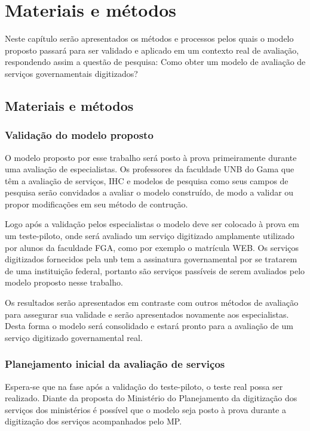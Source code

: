 \chapter[Materiais e métodos]{Materiais e métodos}
Neste capítulo serão apresentados os métodos e processos pelos quais o modelo proposto passará para ser validado e aplicado em um contexto real de avaliação, respondendo assim a questão de pesquisa: Como obter um modelo de avaliação de serviços governamentais digitizados?

\section{Materiais e métodos}
	\subsection{Validação do modelo proposto}
	O modelo proposto por esse trabalho será posto à prova primeiramente durante uma avaliação de especialistas. Os professores da faculdade UNB do Gama que têm a avaliação de serviços, IHC e modelos de pesquisa como seus campos de pesquisa serão convidados a avaliar o modelo construído, de modo a validar ou propor modificações em seu método de contrução.

	Logo após a validação pelos especialistas o modelo deve ser colocado à prova em um teste-piloto, onde será avaliado um serviço digitizado amplamente utilizado por alunos da faculdade FGA, como por exemplo o matrícula WEB. Os serviços digitizados fornecidos pela unb tem a assinatura governamental por se tratarem de uma instituição federal, portanto são serviços passíveis de serem avaliados pelo modelo proposto nesse trabalho.

	Os resultados serão apresentados em contraste com outros métodos de avaliação para assegurar sua validade e serão apresentados novamente aos especialistas. Desta forma o modelo será consolidado e estará pronto para a avaliação de um serviço digitizado governamental real.

	\subsection{Planejamento inicial da avaliação de serviços}
	Espera-se que na fase após a validação do teste-piloto, o teste real possa ser realizado. Diante da proposta do Ministério do Planejamento da digitização dos serviços dos ministérios é possível que o modelo seja posto à prova durante a digitização dos serviços acompanhados pelo MP.

